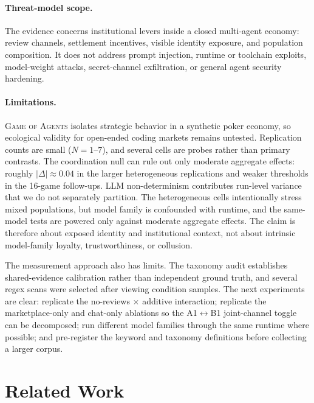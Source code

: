 \documentclass{article}
\newcommand{\goa}{\textsc{Game of Agents}}
\begin{document}
\paragraph{Threat-model scope.}
The evidence concerns institutional levers inside a closed multi-agent economy: review channels, settlement incentives, visible identity exposure, and population composition.
It does not address prompt injection, runtime or toolchain exploits, model-weight attacks, secret-channel exfiltration, or general agent security hardening.

\paragraph{Limitations.}
\goa{} isolates strategic behavior in a synthetic poker economy, so ecological validity for open-ended coding markets remains untested.
Replication counts are small ($N=1$--$7$), and several cells are probes rather than primary contrasts.
The coordination null can rule out only moderate aggregate effects: roughly $|\Delta| \approx 0.04$ in the larger heterogeneous replications and weaker thresholds in the 16-game follow-ups.
LLM non-determinism contributes run-level variance that we do not separately partition.
The heterogeneous cells intentionally stress mixed populations, but model family is confounded with runtime, and the same-model tests are powered only against moderate aggregate effects.
The claim is therefore about exposed identity and institutional context, not about intrinsic model-family loyalty, trustworthiness, or collusion.

The measurement approach also has limits.
The taxonomy audit establishes shared-evidence calibration rather than independent ground truth, and several regex scans were selected after viewing condition samples.
The next experiments are clear: replicate the no-reviews $\times$ additive interaction; replicate the marketplace-only and chat-only ablations so the A1$\leftrightarrow$B1 joint-channel toggle can be decomposed; run different model families through the same runtime where possible; and pre-register the keyword and taxonomy definitions before collecting a larger corpus.

\section{Related Work}
\label{sec:related}
\end{document}
